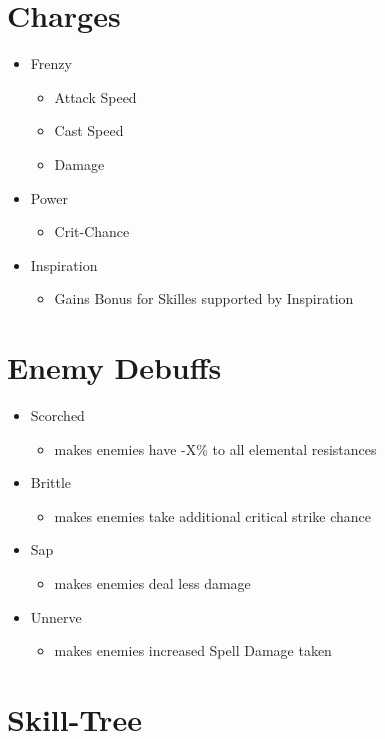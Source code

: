 \section{Charges}
\begin{itemize}
	\item Frenzy 
	\begin{itemize}
		\item Attack Speed
		\item Cast Speed
		\item Damage
	\end{itemize}
	\item Power 
	\begin{itemize}
		\item Crit-Chance
	\end{itemize}
	\item Inspiration 
	\begin{itemize}
		\item Gains Bonus for Skilles supported by Inspiration
	\end{itemize}
\end{itemize}

\section{Enemy Debuffs}
\begin{itemize}
	\item Scorched 
	\begin{itemize}
		\item makes enemies have -X\% to all elemental resistances
	\end{itemize}
	\item Brittle 
	\begin{itemize}
		\item makes enemies take additional critical strike chance
	\end{itemize}
	\item Sap 
	\begin{itemize}
		\item makes enemies deal less damage
	\end{itemize}
	\item Unnerve 
	\begin{itemize}
		\item makes enemies increased Spell Damage taken
	\end{itemize}
\end{itemize}

\section{Skill-Tree}

